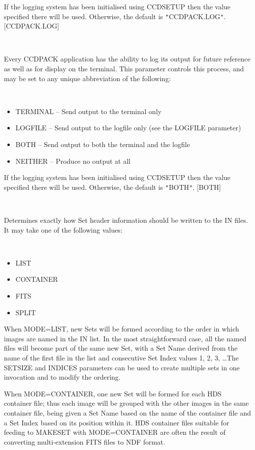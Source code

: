 \documentclass[twoside,11pt]{article}
\newcommand{\htmlref}[2]{#1}
\renewcommand{\_}{\texttt{\symbol{95}}}
\newcommand{\xroutine}[1]{\htmlref{{\sc #1}}{#1}}
\newcommand{\sstsubsection}[1]{ \item[{#1}] \mbox{} \\}
\newcommand{\sstitemlist}[1]{
  \mbox{} \\
  \vspace{-3.5ex}
  \begin{itemize}
     #1
  \end{itemize}
}
\newcommand{\sstitem}{\item}
\newcommand{\sstsubsection}[1]{\item[{#1}]}
\newcommand{\sstitemlist}[1]{
      \begin{itemize}
         #1
      \end{itemize}
      \\
   }
\newcommand{\sstitem}{\item}
\begin{document}
{{{         If the logging system has been initialised using \xroutine{CCDSETUP}
         then the value specified there will be used. Otherwise, the
         default is {\tt "}CCDPACK.LOG{\tt "}.
         [CCDPACK.LOG]
      }
      \sstsubsection{
         LOGTO = LITERAL (Read)
      }{
         Every CCDPACK application has the ability to log its output
         for future reference as well as for display on the terminal.
         This parameter controls this process, and may be set to any
         unique abbreviation of the following:
         \sstitemlist{

            \sstitem
               TERMINAL  -- Send output to the terminal only

            \sstitem
               LOGFILE   -- Send output to the logfile only (see the
                               LOGFILE parameter)

            \sstitem
               BOTH      -- Send output to both the terminal and the
                               logfile

            \sstitem
               NEITHER   -- Produce no output at all

         }
         If the logging system has been initialised using \xroutine{CCDSETUP}
         then the value specified there will be used. Otherwise, the
         default is {\tt "}BOTH{\tt "}.
         [BOTH]
      }
      \sstsubsection{
         MODE = LITERAL (Read)
      }{
         Determines exactly how Set header information should be written
         to the IN files.  It may take one of the following values:
         \sstitemlist{

            \sstitem
               LIST

            \sstitem
               CONTAINER

            \sstitem
               FITS

            \sstitem
               SPLIT

         }
         When MODE=LIST, new Sets will be formed according to the
         order in which images are named in the IN list.
         In the most straightforward case, all the named files will
         become part of the same new Set, with a Set Name derived
         from the name of the first file in the list and consecutive
         Set Index values 1, 2, 3, \ldots  The SETSIZE and INDICES
         parameters can be used to create multiple sets in one
         invocation and to modify the ordering.

         When MODE=CONTAINER, one new Set will be formed for each HDS
         container file; thus each image will be grouped with the
         other images in the same container file, being given a Set
         Name based on the name of the container file and a Set Index
         based on its position within it.  HDS container files
         suitable for feeding to MAKESET with MODE=CONTAINER are often
         the result of converting multi-extension FITS files to NDF
         format.

}}}
\end{document}
